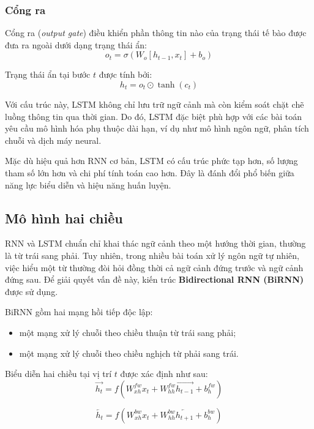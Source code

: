\documentclass[a4paper,12pt,twoside]{report}
\begin{document}
\subsubsection{Cổng ra}

Cổng ra (\textit{output gate}) điều khiển phần thông tin nào của trạng thái tế bào được đưa ra ngoài dưới dạng trạng thái ẩn:
\begin{equation}
o_t = \sigma(W_o[h_{t-1}, x_t] + b_o)
\end{equation}

Trạng thái ẩn tại bước $t$ được tính bởi:
\begin{equation}
h_t = o_t \odot \tanh(c_t)
\end{equation}

Với cấu trúc này, LSTM không chỉ lưu trữ ngữ cảnh mà còn kiểm soát chặt chẽ luồng thông tin qua thời gian. Do đó, LSTM đặc biệt phù hợp với các bài toán yêu cầu mô hình hóa phụ thuộc dài hạn, ví dụ như mô hình ngôn ngữ, phân tích chuỗi và dịch máy neural.

Mặc dù hiệu quả hơn RNN cơ bản, LSTM có cấu trúc phức tạp hơn, số lượng tham số lớn hơn và chi phí tính toán cao hơn. Đây là đánh đổi phổ biến giữa năng lực biểu diễn và hiệu năng huấn luyện.

\subsection{Mô hình hai chiều}

RNN và LSTM chuẩn chỉ khai thác ngữ cảnh theo một hướng thời gian, thường là từ trái sang phải. Tuy nhiên, trong nhiều bài toán xử lý ngôn ngữ tự nhiên, việc hiểu một từ thường đòi hỏi đồng thời cả ngữ cảnh đứng trước và ngữ cảnh đứng sau. Để giải quyết vấn đề này, kiến trúc \textbf{Bidirectional RNN (BiRNN)} được sử dụng.

BiRNN gồm hai mạng hồi tiếp độc lập:
\begin{itemize}
    \item một mạng xử lý chuỗi theo chiều thuận từ trái sang phải;
    \item một mạng xử lý chuỗi theo chiều nghịch từ phải sang trái.
\end{itemize}

Biểu diễn hai chiều tại vị trí $t$ được xác định như sau:
\begin{equation}
\overrightarrow{h_t} = f(W^{fw}_{xh}x_t + W^{fw}_{hh}\overrightarrow{h_{t-1}} + b^{fw}_h)
\end{equation}

\begin{equation}
\overleftarrow{h_t} = f(W^{bw}_{xh}x_t + W^{bw}_{hh}\overleftarrow{h_{t+1}} + b^{bw}_h)
\end{equation}
\end{document}
